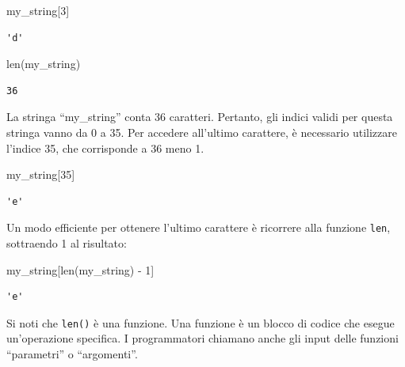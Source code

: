 \documentclass[
  letterpaper,
  krantz2]{{[}./krantz{]}}
\newenvironment{Shaded}{\begin{snugshade}}{\end{snugshade}}
\newcommand{\BuiltInTok}[1]{\textcolor[rgb]{0.00,0.23,0.31}{#1}}
\newcommand{\DecValTok}[1]{\textcolor[rgb]{0.68,0.00,0.00}{#1}}
\newcommand{\NormalTok}[1]{\textcolor[rgb]{0.00,0.23,0.31}{#1}}
\newcommand{\OperatorTok}[1]{\textcolor[rgb]{0.37,0.37,0.37}{#1}}
\begin{document}
\begin{Shaded}
\begin{Highlighting}[]
\NormalTok{my\_string[}\DecValTok{3}\NormalTok{]}
\end{Highlighting}
\end{Shaded}

\begin{verbatim}
'd'
\end{verbatim}

\begin{Shaded}
\begin{Highlighting}[]
\BuiltInTok{len}\NormalTok{(my\_string)}
\end{Highlighting}
\end{Shaded}

\begin{verbatim}
36
\end{verbatim}

La stringa ``my\_string'' conta 36 caratteri. Pertanto, gli indici
validi per questa stringa vanno da 0 a 35. Per accedere all'ultimo
carattere, è necessario utilizzare l'indice 35, che corrisponde a 36
meno 1.

\begin{Shaded}
\begin{Highlighting}[]
\NormalTok{my\_string[}\DecValTok{35}\NormalTok{]}
\end{Highlighting}
\end{Shaded}

\begin{verbatim}
'e'
\end{verbatim}

Un modo efficiente per ottenere l'ultimo carattere è ricorrere alla
funzione \texttt{len}, sottraendo 1 al risultato:

\begin{Shaded}
\begin{Highlighting}[]
\NormalTok{my\_string[}\BuiltInTok{len}\NormalTok{(my\_string) }\OperatorTok{{-}} \DecValTok{1}\NormalTok{]}
\end{Highlighting}
\end{Shaded}

\begin{verbatim}
'e'
\end{verbatim}

Si noti che \texttt{len()} è una funzione. Una funzione è un blocco di
codice che esegue un'operazione specifica. I programmatori chiamano
anche gli input delle funzioni ``parametri'' o ``argomenti''.
\end{document}
